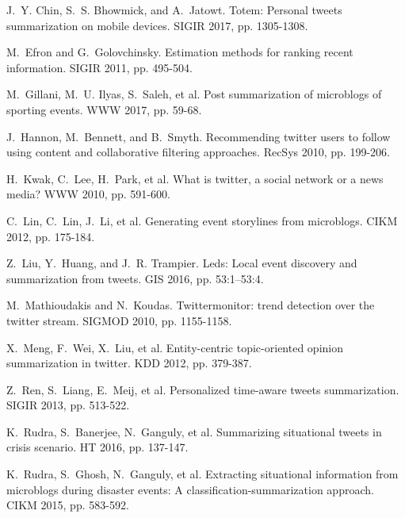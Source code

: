 \documentclass[envcountsame]{llncs}
\begin{document}
\begin{thebibliography}{10}

J.~Y. Chin, S.~S. Bhowmick, and A.~Jatowt.
\newblock Totem: Personal tweets summarization on mobile devices.
\newblock SIGIR 2017, pp. 1305-1308.

M.~Efron and G.~Golovchinsky.
\newblock Estimation methods for ranking recent information.
\newblock SIGIR 2011, pp. 495-504.

M.~Gillani, M.~U. Ilyas, S.~Saleh, et al.
\newblock Post summarization of microblogs of sporting events.
\newblock WWW 2017, pp. 59-68.

J.~Hannon, M.~Bennett, and B.~Smyth.
\newblock Recommending twitter users to follow using content and collaborative filtering approaches.
\newblock RecSys 2010, pp. 199-206.

H.~Kwak, C.~Lee, H.~Park, et al.
\newblock What is twitter, a social network or a news media?
\newblock WWW 2010, pp. 591-600.

C.~Lin, C.~Lin, J.~Li, et al.
\newblock Generating event storylines from microblogs.
\newblock CIKM 2012, pp. 175-184.

Z.~Liu, Y.~Huang, and J.~R. Trampier.
\newblock Leds: Local event discovery and summarization from tweets.
\newblock GIS 2016, pp. 53:1--53:4.

M.~Mathioudakis and N.~Koudas.
\newblock Twittermonitor: trend detection over the twitter stream.
\newblock SIGMOD 2010, pp. 1155-1158.

X.~Meng, F.~Wei, X.~Liu, et al.
\newblock Entity-centric topic-oriented opinion summarization in twitter.
\newblock KDD 2012, pp. 379-387.

Z.~Ren, S.~Liang, E.~Meij, et al.
\newblock Personalized time-aware tweets summarization.
\newblock SIGIR 2013, pp. 513-522.

K.~Rudra, S.~Banerjee, N.~Ganguly, et al.
\newblock Summarizing situational tweets in crisis scenario.
\newblock HT 2016, pp. 137-147.

K.~Rudra, S.~Ghosh, N.~Ganguly, et al.
\newblock Extracting situational information from microblogs during disaster events: A classification-summarization approach.
\newblock CIKM 2015, pp. 583-592.


\end{thebibliography}
\end{document}
